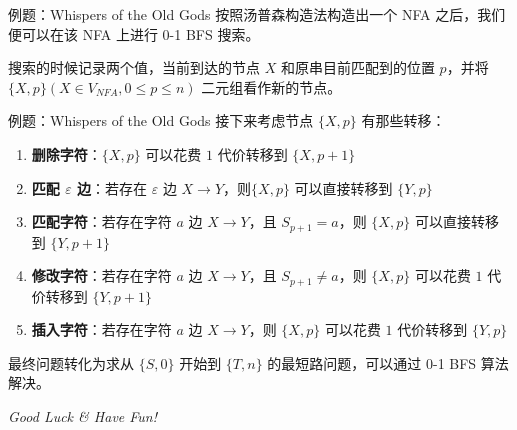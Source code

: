 \documentclass[12pt,aspectratio=169]{beamer}
\begin{document}
\begin{frame}[fragile]{例题：Whispers of the Old Gods}
  按照汤普森构造法构造出一个 NFA 之后，我们便可以在该 NFA 上进行 0-1 BFS 搜索。

  搜索的时候记录两个值，当前到达的节点 $X$ 和原串目前匹配到的位置 $p$，并将 $\{X, p\} (X \in V_{NFA}, 0 \le p \le n)$ 二元组看作新的节点。
\end{frame}

\begin{frame}[fragile]{例题：Whispers of the Old Gods}
  接下来考虑节点 $\{X, p\}$ 有那些转移：

  \begin{enumerate}
    \item \textbf{删除字符}：$\{X, p\}$ 可以花费 $1$ 代价转移到 $\{X, p+1\}$
    \item \textbf{匹配 $\varepsilon$ 边}：若存在 $\varepsilon$ 边 $X \to Y$，则$\{X, p\}$ 可以直接转移到 $\{Y, p\}$
    \item \textbf{匹配字符}：若存在字符 $a$ 边 $X \to Y$，且 $S_{p+1}=a$，则 $\{X, p\}$ 可以直接转移到 $\{Y, p+1\}$
    \item \textbf{修改字符}：若存在字符 $a$ 边 $X \to Y$，且 $S_{p+1} \ne a$，则 $\{X, p\}$ 可以花费 $1$ 代价转移到 $\{Y, p+1\}$
    \item \textbf{插入字符}：若存在字符 $a$ 边 $X \to Y$，则 $\{X, p\}$ 可以花费 $1$ 代价转移到 $\{Y, p\}$
  \end{enumerate}

  最终问题转化为求从 $\{S, 0\}$ 开始到 $\{T, n\}$ 的最短路问题，可以通过 0-1 BFS 算法解决。
\end{frame}

\begin{frame}{}
  \centering \Large
  \emph{Good Luck \& Have Fun!}
\end{frame}
\end{document}
